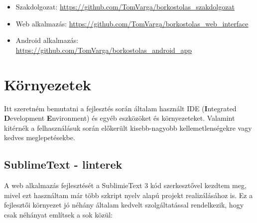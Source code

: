 \documentclass[12pt]{report}
\theoremstyle{definition}
\begin{document}
	\begin{itemize}
		\item Szakdolgozat: \newline
		\url{https://github.com/TomVarga/borkostolas_szakdolgozat}
		\item Web alkalmazás: \newline \url{https://github.com/TomVarga/borkostolas_web_interface}
		\item Android alkalmazás: \newline \url{https://github.com/TomVarga/borkostolas_android_app}
	\end{itemize}
	
	
	\section{Környezetek}
	Itt szeretném bemutatni a fejlesztés során általam használt IDE (\textbf{I}ntegrated \textbf{D}evelopment \textbf{E}nvironment) és egyéb eszközöket és környezeteket. Valamint kitérnék a felhasználásuk során előkerült kisebb-nagyobb kellemetlenségekre vagy kedves meglepetésekbe.
	
	\subsection{SublimeText - linterek}
	A web alkalmazás fejlesztését a SublimieText 3 \cite{SublimeText} kód szerkesztővel kezdtem meg, mivel ezt használtam már több szkript nyelv alapú projekt realizálásához is. Ez a fejlesztői környezet jó néhány általam kedvelt szolgáltatással rendelkezik, hogy csak néhányat említsek a sok közül:
	
\end{document}
